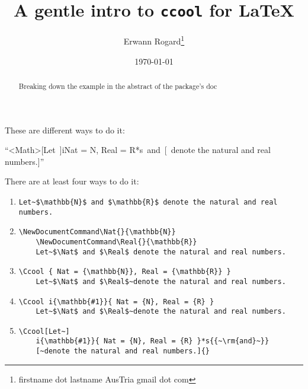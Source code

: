 \documentclass{article}
\title{A gentle intro to \texttt{ccool} for \LaTeX}
\author{Erwann Rogard\thanks{firstname dot lastname AusTria gmail dot com}}
\date{\today}
\begin{document}
\maketitle

\begin{abstract}
  Breaking down the example in the abstract of the package's doc\cite{ccool}
\end{abstract}These are different ways to do it:
\begin{center}
  ``\Ccool<Math>[Let~]i{}{Nat = N, Real = R}*s{{~\rm{and}~}}[~denote the natural and real numbers.]{}''
\end{center}

There are at least four ways to do it:
\begin{enumerate}[label=\emph{\roman*)}]
\item \label{ways:i}
  \begin{Verbatim}[breaklines=true]
    Let~$\mathbb{N}$ and $\mathbb{R}$ denote the natural and real numbers.
  \end{Verbatim}
\item   \label{ways:ii}
  \begin{Verbatim}[breaklines=true]
    \NewDocumentCommand\Nat{}{\mathbb{N}}
    \NewDocumentCommand\Real{}{\mathbb{R}}
    Let~$\Nat$ and $\Real$ denote the natural and real numbers.
  \end{Verbatim}

\item  \label{ways:iii}
  \begin{Verbatim}[breaklines=true]
    \Ccool { Nat = {\mathbb{N}}, Real = {\mathbb{R}} }
    Let~$\Nat$ and $\Real$~denote the natural and real numbers.
  \end{Verbatim}

\item  \label{ways:iv}
  \begin{Verbatim}[breaklines=true]
    \Ccool i{\mathbb{#1}}{ Nat = {N}, Real = {R} }
    Let~$\Nat$ and $\Real$~denote the natural and real numbers.
  \end{Verbatim}

\item  \label{ways:v}
  \begin{Verbatim}[breaklines=true]
    \Ccool[Let~]
    i{\mathbb{#1}}{ Nat = {N}, Real = {R} }*s{{~\rm{and}~}}
    [~denote the natural and real numbers.]{}
  \end{Verbatim}
\end{enumerate}
\end{document}

